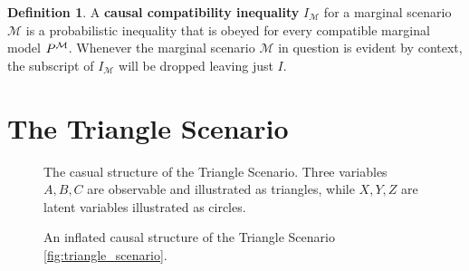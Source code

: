 \documentclass[aps, 10pt, english, twoside, pra, nofootinbib, longbibliography]{revtex4-1}
\theoremstyle{plain}
\theoremstyle{definition}
\newtheorem{definition}[theorem]{Definition}
\theoremstyle{remark}
\newcommand{\mscenario}{\mathcal{M}}
\newcommand{\term}[1]{\textcolor{Mahogany}{\textbf{#1}}}
\begin{document}
    \begin{definition}
        A \term{causal compatibility inequality} $I_{\mscenario}$ for a marginal scenario $\mscenario$ is a probabilistic inequality that is obeyed for every compatible marginal model $\prob^{\mscenario}$. Whenever the marginal scenario $\mscenario$ in question is evident by context, the subscript of $I_{\mscenario}$ will be dropped leaving just $I$.
    \end{definition}


    \section{The Triangle Scenario}
    \label{sec:triangle_scenario}
    \begin{figure}
    \begin{center}
        \begin{minipage}[b]{.48\textwidth}
            \centering
            \scalebox{1.0}{}
            \caption{The casual structure of the Triangle Scenario. Three variables $A,B,C$ are observable and illustrated as triangles, while $X, Y, Z$ are latent variables illustrated as circles.}
            \label{fig:triangle_scenario}
        \end{minipage}\hspace{0.04\textwidth}%
        \begin{minipage}[b]{.48\textwidth}
            \centering
            \scalebox{0.8}{}
            \caption{An inflated causal structure of the Triangle Scenario \cref{fig:triangle_scenario}.}
            \label{fig:inflated_triangle_scenario}
        \end{minipage}
    \end{center}
    \end{figure}
\end{document}
